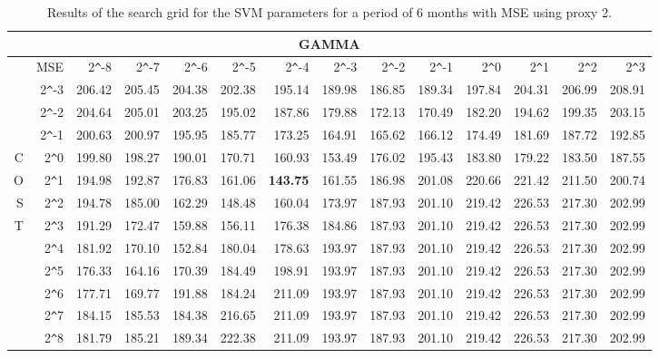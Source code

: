 \begin{table}[h!]
\centering
\begin{adjustbox}{width=\textwidth}
\begin{tabular}{|r|r|rrrrrrrrrrrr|}
\hline
\multicolumn{14}{|c|}{GAMMA} \tabularnewline
 \hline
 &MSE& 2\verb|^|-8 & 2\verb|^|-7 & 2\verb|^|-6 & 2\verb|^|-5 & 2\verb|^|-4 & 2\verb|^|-3 & 2\verb|^|-2 & 2\verb|^|-1 & 2\verb|^|0 & 2\verb|^|1 & 2\verb|^|2 & 2\verb|^|3 \\ 
  \hline
  &2\verb|^|-3 & 206.42 & 205.45 & 204.38 & 202.38 & 195.14 & 189.98 & 186.85 & 189.34 & 197.84 & 204.31 & 206.99 & 208.91 \\ 
  &2\verb|^|-2 & 204.64 & 205.01 & 203.25 & 195.02 & 187.86 & 179.88 & 172.13 & 170.49 & 182.20 & 194.62 & 199.35 & 203.15 \\ 
  &2\verb|^|-1 & 200.63 & 200.97 & 195.95 & 185.77 & 173.25 & 164.91 & 165.62 & 166.12 & 174.49 & 181.69 & 187.72 & 192.85 \\ 
  C&2\verb|^|0 & 199.80 & 198.27 & 190.01 & 170.71 & 160.93 & 153.49 & 176.02 & 195.43 & 183.80 & 179.22 & 183.50 & 187.55 \\ 
  O&2\verb|^|1 & 194.98 & 192.87 & 176.83 & 161.06 & \textbf{143.75} & 161.55 & 186.98 & 201.08 & 220.66 & 221.42 & 211.50 & 200.74 \\ 
  S&2\verb|^|2 & 194.78 & 185.00 & 162.29 & 148.48 & 160.04 & 173.97 & 187.93 & 201.10 & 219.42 & 226.53 & 217.30 & 202.99 \\ 
  T&2\verb|^|3 & 191.29 & 172.47 & 159.88 & 156.11 & 176.38 & 184.86 & 187.93 & 201.10 & 219.42 & 226.53 & 217.30 & 202.99 \\ 
  &2\verb|^|4 & 181.92 & 170.10 & 152.84 & 180.04 & 178.63 & 193.97 & 187.93 & 201.10 & 219.42 & 226.53 & 217.30 & 202.99 \\ 
  &2\verb|^|5 & 176.33 & 164.16 & 170.39 & 184.49 & 198.91 & 193.97 & 187.93 & 201.10 & 219.42 & 226.53 & 217.30 & 202.99 \\ 
  &2\verb|^|6 & 177.71 & 169.77 & 191.88 & 184.24 & 211.09 & 193.97 & 187.93 & 201.10 & 219.42 & 226.53 & 217.30 & 202.99 \\ 
  &2\verb|^|7 & 184.15 & 185.53 & 184.38 & 216.65 & 211.09 & 193.97 & 187.93 & 201.10 & 219.42 & 226.53 & 217.30 & 202.99 \\ 
  &2\verb|^|8 & 181.79 & 185.21 & 189.34 & 222.38 & 211.09 & 193.97 & 187.93 & 201.10 & 219.42 & 226.53 & 217.30 & 202.99 \\ 
   \hline
\end{tabular}
\end{adjustbox}
\caption{Results of the search grid for the SVM parameters for a period of 6 months with MSE using proxy 2.}
\end{table}
